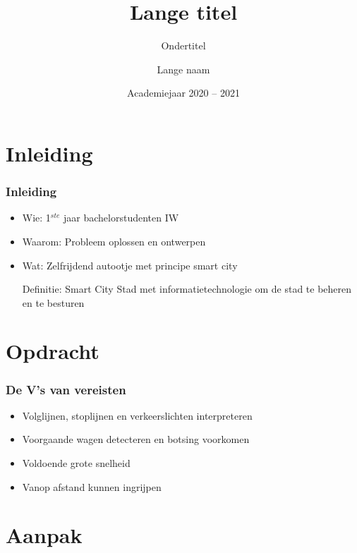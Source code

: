 \documentclass
   [kulak] %
   {kulakbeamer}
\title[Korte titel]{Lange titel}
\subtitle{Ondertitel}
\author[Korte naam]{Lange naam}
\institute[Kulak]{KU Leuven Kulak}
\date{Academiejaar 2020 -- 2021}
\begin{document}
\begin{titleframe}
\titlepage
\end{titleframe}

\begin{outlineframe}[Overzicht]
\tableofcontents
\end{outlineframe}


\section{Inleiding}

\begin{frame}
\frametitle{Inleiding}
\begin{itemize}
	\item Wie: 1$^{ste}$ jaar bachelorstudenten IW 
	\item Waarom: Probleem oplossen en ontwerpen
	\item Wat:
		\subitem Zelfrijdend autootje met principe smart city
	\begin{block}{Definitie: Smart City}
		Stad met informatietechnologie om de stad te beheren en te besturen \cite{SmartCity}
	\end{block}
\end{itemize}
\end{frame}


\section[Opdracht]{Opdracht}%

\begin{frame}
\frametitle{De V's van vereisten}
\begin{itemize}
	\item Volglijnen, stoplijnen en verkeerslichten interpreteren
	\item Voorgaande wagen detecteren en botsing voorkomen
	\item Voldoende grote snelheid
	\item Vanop afstand kunnen ingrijpen
\end{itemize}

\end{frame}



\section[Aanpak]{Aanpak}
\end{document}

